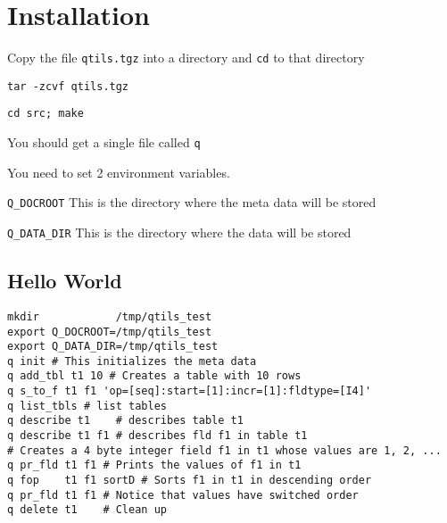 \documentclass[letterpaper]{article}
\begin{document}
\section{Installation}
\be
\item Copy the file {\tt qtils.tgz} into a directory and {\tt cd} to that directory
\item {\tt tar -zcvf qtils.tgz}
\item {\tt cd src; make}
\item You should get a single file called {\tt q}
\ee

You need to set 2 environment variables.
\be
\item 
\verb+Q_DOCROOT+  This is the directory where the meta data will be stored
\item 
\verb+Q_DATA_DIR+ This is the directory where the      data will be stored
\ee

\subsection{Hello World}
\begin{verbatim}
mkdir            /tmp/qtils_test
export Q_DOCROOT=/tmp/qtils_test
export Q_DATA_DIR=/tmp/qtils_test
q init # This initializes the meta data
q add_tbl t1 10 # Creates a table with 10 rows
q s_to_f t1 f1 'op=[seq]:start=[1]:incr=[1]:fldtype=[I4]'
q list_tbls # list tables
q describe t1    # describes table t1 
q describe t1 f1 # describes fld f1 in table t1 
# Creates a 4 byte integer field f1 in t1 whose values are 1, 2, ...
q pr_fld t1 f1 # Prints the values of f1 in t1 
q fop    t1 f1 sortD # Sorts f1 in t1 in descending order
q pr_fld t1 f1 # Notice that values have switched order
q delete t1    # Clean up
\end{verbatim}
\end{document}
